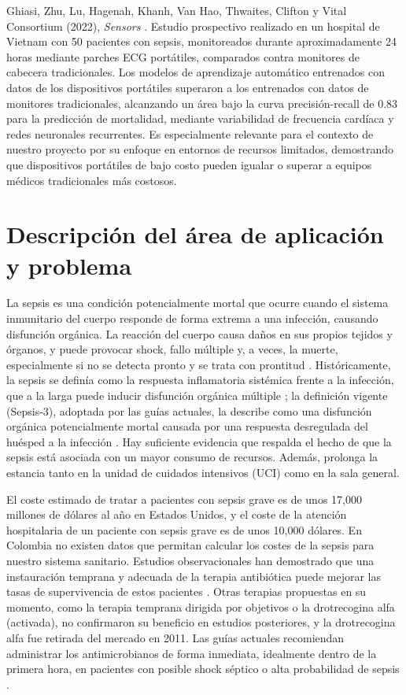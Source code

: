 \documentclass[11pt,a4paper]{article}
\begin{document}
Ghiasi, Zhu, Lu, Hagenah, Khanh, Van Hao, Thwaites, Clifton y Vital Consortium (2022), \textit{Sensors} \cite{ref21}. Estudio prospectivo realizado en un hospital de Vietnam con 50 pacientes con sepsis, monitoreados durante aproximadamente 24 horas mediante parches ECG portátiles, comparados contra monitores de cabecera tradicionales. Los modelos de aprendizaje automático entrenados con datos de los dispositivos portátiles superaron a los entrenados con datos de monitores tradicionales, alcanzando un área bajo la curva precisión-recall de 0.83 para la predicción de mortalidad, mediante variabilidad de frecuencia cardíaca y redes neuronales recurrentes. Es especialmente relevante para el contexto de nuestro proyecto por su enfoque en entornos de recursos limitados, demostrando que dispositivos portátiles de bajo costo pueden igualar o superar a equipos médicos tradicionales más costosos.


\section{Descripción del área de aplicación y problema}\label{sec:problema}

La sepsis es una condición potencialmente mortal que ocurre cuando el sistema inmunitario del cuerpo responde de forma extrema a una infección, causando disfunción orgánica. La reacción del cuerpo causa daños en sus propios tejidos y órganos, y puede provocar shock, fallo múltiple y, a veces, la muerte, especialmente si no se detecta pronto y se trata con prontitud \cite{ref1}. Históricamente, la sepsis se definía como la respuesta inflamatoria sistémica frente a la infección, que a la larga puede inducir disfunción orgánica múltiple \cite{ref2}; la definición vigente (Sepsis-3), adoptada por las guías actuales, la describe como una disfunción orgánica potencialmente mortal causada por una respuesta desregulada del huésped a la infección \cite{ref10}. Hay suficiente evidencia que respalda el hecho de que la sepsis está asociada con un mayor consumo de recursos. Además, prolonga la estancia tanto en la unidad de cuidados intensivos (UCI) como en la sala general.

El coste estimado de tratar a pacientes con sepsis grave es de unos 17,000 millones de dólares al año en Estados Unidos, y el coste de la atención hospitalaria de un paciente con sepsis grave es de unos 10,000 dólares. En Colombia no existen datos que permitan calcular los costes de la sepsis para nuestro sistema sanitario. Estudios observacionales han demostrado que una instauración temprana y adecuada de la terapia antibiótica puede mejorar las tasas de supervivencia de estos pacientes \cite{ref3}. Otras terapias propuestas en su momento, como la terapia temprana dirigida por objetivos o la drotrecogina alfa (activada), no confirmaron su beneficio en estudios posteriores, y la drotrecogina alfa fue retirada del mercado en 2011. Las guías actuales recomiendan administrar los antimicrobianos de forma inmediata, idealmente dentro de la primera hora, en pacientes con posible shock séptico o alta probabilidad de sepsis \cite{ref10}.
\end{document}
